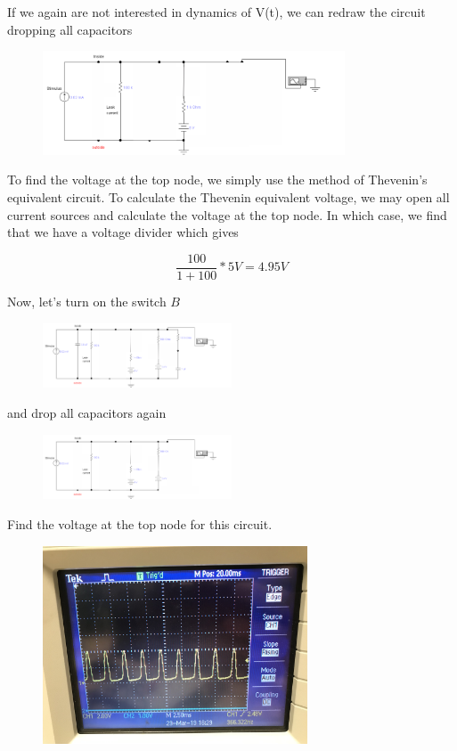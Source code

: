 \documentclass[12]{amsbook}
\newcommand\0{\mathbf{0}}
\newcommand\<{\langle}
\renewcommand\>{\rangle}
\begin{document}
If we again are not interested in dynamics of V(t), we can redraw the circuit dropping all capacitors
 
 \begin{figure}[H]
\includegraphics[width=0.8\textwidth]{exercise1-4}
\end{figure}

To find the voltage at the top node, we simply use the method of Thevenin's equivalent circuit\cite{fortney1987principles}. To calculate the Thevenin equivalent voltage, we may open all current sources and calculate the voltage at the top node. In which case, we find that we have a voltage divider which gives 

$$\frac{100}{1+100} * 5V = 4.95 V$$

Now, let's turn on the switch $B$
 
 \begin{figure}[H]
\includegraphics[width=0.5\textwidth]{exercise1-5}
\end{figure}

and drop all capacitors again
 
\begin{figure}[H]
\includegraphics[width=0.5\textwidth]{exercise1-6}
\end{figure}

Find the voltage at the top node for this circuit.

\begin{figure}[H]
\centering
\includegraphics[width=0.7\textwidth]{neuron.jpeg}	
\end{figure}
\end{document}
